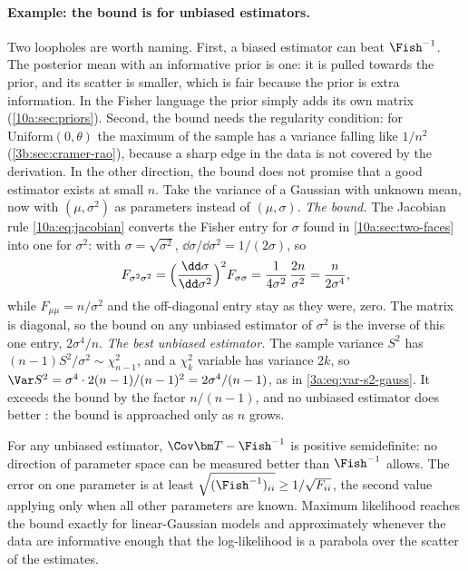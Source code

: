 \paragraph{Example: the bound is for unbiased estimators.} Two loopholes are worth naming. First, a biased
estimator can beat $\Fish^{-1}$. The posterior mean with an informative prior is one: it is pulled towards
the prior, and its scatter is smaller, which is fair because the prior is extra information. In the Fisher
language the prior simply adds its own matrix (\cref{10a:sec:priors}). Second, the bound needs the regularity
condition: for $\mathrm{Uniform}(0,\theta)$ the maximum of the sample has a variance falling like $1/n^2$
(\cref{3b:sec:cramer-rao}), because a sharp edge in the data is not covered by the derivation. In the other
direction, the bound does not promise that a good estimator exists at small $n$. Take the variance of a
Gaussian with unknown mean, now with $(\mu,\sigma^2)$ as parameters instead of $(\mu,\sigma)$. \emph{The bound.} The
Jacobian rule \eqref{10a:eq:jacobian} converts the Fisher entry for $\sigma$ found in \cref{10a:sec:two-faces} into
one for $\sigma^2$: with $\sigma=\sqrt{\sigma^2}$, $\dd\sigma/\dd\sigma^2=1/(2\sigma)$, so
\[
  F_{\sigma^2\sigma^2}=\Bigl(\frac{\dd\sigma}{\dd\sigma^2}\Bigr)^2F_{\sigma\sigma}=\frac1{4\sigma^2}\,\frac{2n}{\sigma^2}=\frac n{2\sigma^4},
\]
while $F_{\mu\mu}=n/\sigma^2$ and the off-diagonal entry stay as they were, zero. The matrix is diagonal, so the bound
on any unbiased estimator of $\sigma^2$ is the inverse of this one entry, $2\sigma^4/n$. \emph{The best unbiased
estimator.} The sample variance $S^2$ has $(n-1)S^2/\sigma^2\sim\chi^2_{n-1}$, and a $\chi^2_k$ variable has variance
$2k$, so $\Var S^2=\sigma^4\cdot2(n-1)/(n-1)^2=2\sigma^4/(n-1)$, as in \eqref{3a:eq:var-s2-gauss}. It exceeds the
bound by the factor $n/(n-1)$, and no unbiased estimator does better : the bound is
approached only as $n$ grows.

\begin{keyidea}
For any unbiased estimator, $\Cov\bm T-\Fish^{-1}$ is positive semidefinite: no direction of parameter space
can be measured better than $\Fish^{-1}$ allows. The error on one parameter is at least
$\sqrt{(\Fish^{-1})_{ii}}\ge1/\sqrt{F_{ii}}$, the second value applying only when all other parameters are
known. Maximum likelihood reaches the bound exactly for linear-Gaussian models and approximately whenever
the data are informative enough that the log-likelihood is a parabola over the scatter of the estimates.
\end{keyidea}
